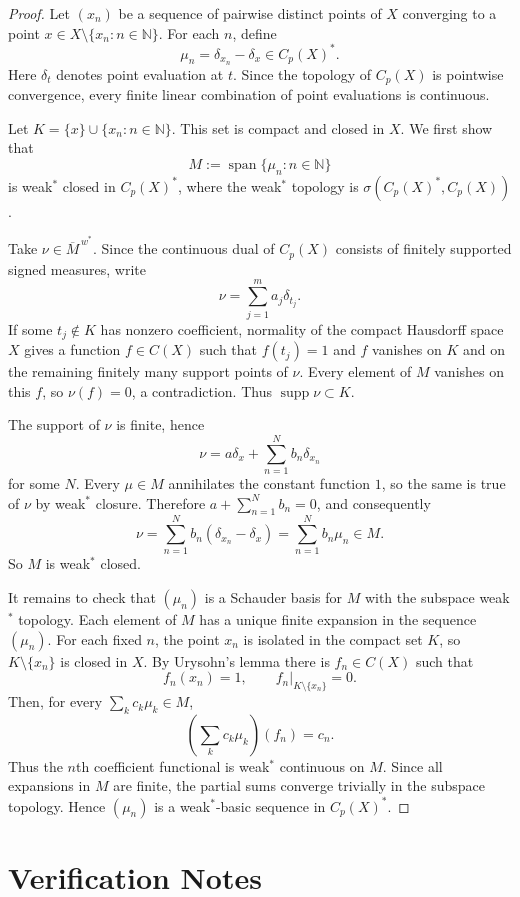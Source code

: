 \documentclass[11pt]{article}
\newcommand{\Cp}{C_p}
\newcommand{\supp}{\operatorname{supp}}
\newcommand{\spanlin}{\operatorname{span}}
\begin{document}
\begin{proof}
Let $(x_n)$ be a sequence of pairwise distinct points of $X$ converging to a
point $x\in X\setminus\{x_n:n\in\mathbb N\}$. For each $n$, define
\[
  \mu_n=\delta_{x_n}-\delta_x\in \Cp(X)^*.
\]
Here $\delta_t$ denotes point evaluation at $t$. Since the topology of
$\Cp(X)$ is pointwise convergence, every finite linear combination of point
evaluations is continuous.

Let $K=\{x\}\cup\{x_n:n\in\mathbb N\}$. This set is compact and closed in
$X$. We first show that
\[
  M:=\spanlin\{\mu_n:n\in\mathbb N\}
\]
is weak$^*$ closed in $\Cp(X)^*$, where the weak$^*$ topology is
$\sigma(\Cp(X)^*,\Cp(X))$.

Take $\nu\in\overline{M}^{\,w^*}$. Since the continuous dual of $\Cp(X)$
consists of finitely supported signed measures, write
\[
  \nu=\sum_{j=1}^m a_j\delta_{t_j}.
\]
If some $t_j\notin K$ has nonzero coefficient, normality of the compact
Hausdorff space $X$ gives a function $f\in C(X)$ such that $f(t_j)=1$ and
$f$ vanishes on $K$ and on the remaining finitely many support points of
$\nu$. Every element of $M$ vanishes on this $f$, so $\nu(f)=0$, a
contradiction. Thus $\supp\nu\subset K$.

The support of $\nu$ is finite, hence
\[
  \nu=a\delta_x+\sum_{n=1}^N b_n\delta_{x_n}
\]
for some $N$. Every $\mu\in M$ annihilates the constant function $1$, so
the same is true of $\nu$ by weak$^*$ closure. Therefore
$a+\sum_{n=1}^N b_n=0$, and consequently
\[
  \nu=\sum_{n=1}^N b_n(\delta_{x_n}-\delta_x)
      =\sum_{n=1}^N b_n\mu_n\in M.
\]
So $M$ is weak$^*$ closed.

It remains to check that $(\mu_n)$ is a Schauder basis for $M$ with the
subspace weak$^*$ topology. Each element of $M$ has a unique finite expansion
in the sequence $(\mu_n)$. For each fixed $n$, the point $x_n$ is isolated in
the compact set $K$, so $K\setminus\{x_n\}$ is closed in $X$. By Urysohn's
lemma there is $f_n\in C(X)$ such that
\[
  f_n(x_n)=1,\qquad f_n\vert_{K\setminus\{x_n\}}=0.
\]
Then, for every $\sum_k c_k\mu_k\in M$,
\[
  \left(\sum_k c_k\mu_k\right)(f_n)=c_n.
\]
Thus the $n$th coefficient functional is weak$^*$ continuous on $M$. Since
all expansions in $M$ are finite, the partial sums converge trivially in
the subspace topology. Hence $(\mu_n)$ is a weak$^*$-basic sequence in
$\Cp(X)^*$.
\end{proof}

\section*{Verification Notes}
\end{document}
